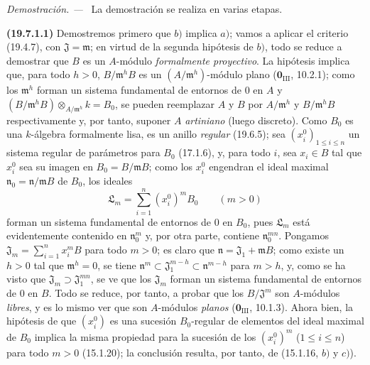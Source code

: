\documentclass[10pt,oneside]{book}
\newenvironment{proof}{%
  \par\medskip\noindent\textit{Demostración. ---\ }}{\par}
\begin{document}
\begin{proof}
La demostración se realiza en varias etapas.

\medskip
\noindent{}\label{0.19.7.1.1-es}\textbf{(19.7.1.1)}\enspace
Demostremos primero que $b)$ implica $a)$; vamos a aplicar el criterio
(19.4.7), con $\mathfrak J=\mathfrak m$; en virtud de la segunda hipótesis
de $b)$, todo se reduce a demostrar que $B$ es un $A$-módulo
\emph{formalmente proyectivo}. La hipótesis implica que, para todo $h>0$,
$B/\mathfrak m^hB$ es un $(A/\mathfrak m^h)$-módulo plano
($\mathbf 0_{\mathrm{III}}$, 10.2.1); como los $\mathfrak m^h$ forman un
sistema fundamental de entornos de 0 en $A$ y
$(B/\mathfrak m^hB)\otimes_{A/\mathfrak m^h}k=B_0$, se pueden reemplazar $A$ y
$B$ por $A/\mathfrak m^h$ y $B/\mathfrak m^hB$ respectivamente y, por tanto,
suponer $A$ \emph{artiniano} (luego discreto). Como $B_0$ es una $k$-álgebra
formalmente lisa, es un anillo \emph{regular} (19.6.5); sea
$(x_i^0)_{1\leq i\leq n}$ un sistema regular de parámetros para $B_0$
(17.1.6), y, para todo $i$, sea $x_i\in B$ tal que $x_i^0$ sea su imagen
en $B_0=B/\mathfrak mB$; como los $x_i^0$ engendran el ideal maximal
$\mathfrak n_0=\mathfrak n/\mathfrak mB$ de $B_0$, los ideales
\[
  \mathfrak L_m=\sum_{i=1}^n(x_i^0)^mB_0 \qquad (m>0)
\]
forman un sistema fundamental de entornos de 0 en $B_0$, pues
$\mathfrak L_m$ está evidentemente contenido en $\mathfrak n_0^m$ y, por otra
parte, contiene $\mathfrak n_0^{mn}$. Pongamos
$\mathfrak J_m=\sum_{i=1}^n x_i^mB$ para todo $m>0$; es claro que
$\mathfrak n=\mathfrak J_1+\mathfrak mB$; como existe un $h>0$ tal que
$\mathfrak m^h=0$, se tiene
$\mathfrak n^m\subset\mathfrak J_1^{m-h}\subset\mathfrak n^{m-h}$ para
$m>h$, y, como se ha visto que $\mathfrak J_m\supset\mathfrak J_1^{mn}$, se ve
que los $\mathfrak J_m$ forman un sistema fundamental de entornos de 0 en
$B$. Todo se reduce, por tanto, a probar que los $B/\mathfrak J^m$ son
$A$-módulos \emph{libres}, y es lo mismo ver que son
$A$-módulos \emph{planos} ($\mathbf 0_{\mathrm{III}}$, 10.1.3). Ahora bien,
la hipótesis de que $(x_i^0)$ es una sucesión $B_0$-regular de elementos del ideal
maximal de $B_0$ implica la misma propiedad para la sucesión de los $(x_i^0)^m$
($1\leq i\leq n$) para todo $m>0$ (15.1.20); la conclusión resulta, por tanto, de
(15.1.16, $b)$ y $c)$).
\end{proof}
\end{document}
